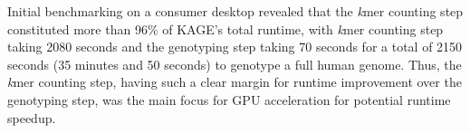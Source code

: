 Initial benchmarking on a consumer desktop revealed that the \textit{k}mer counting step constituted more than 96\% of KAGE's total runtime, with \textit{k}mer counting step taking 2080 seconds and the genotyping step taking 70 seconds for a total of 2150 seconds (35 minutes and 50 seconds) to genotype a full human genome.
Thus, the \textit{k}mer counting step, having such a clear margin for runtime improvement over the genotyping step, was the main focus for GPU acceleration for potential runtime speedup.
